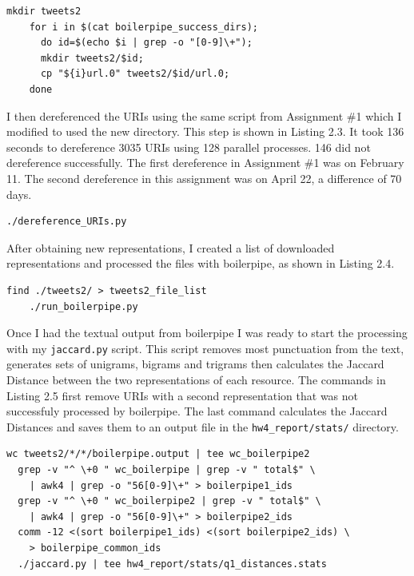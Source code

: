 \documentclass[a4paper,12pt]{article}
\begin{document}
\begin{lstlisting}[basicstyle=\ttfamily,caption={Creating Second Tweets Directory}]
    mkdir tweets2
    for i in $(cat boilerpipe_success_dirs);
      do id=$(echo $i | grep -o "[0-9]\+");
      mkdir tweets2/$id;
      cp "${i}url.0" tweets2/$id/url.0;
    done
\end{lstlisting}

I then dereferenced the URIs using the same script from Assignment \#1 which I modified to
used the new directory\cite{hw1}. This step is shown in Listing 2.3. It took 136 seconds to dereference
3035 URIs using 128 parallel processes. 146 did not dereference successfully. The first dereference in
Assignment \#1 was on February 11. The second dereference in this assignment was on April 22, a difference
of 70 days.

\begin{lstlisting}[basicstyle=\ttfamily,caption={Dereferencing URIs}]
    ./dereference_URIs.py
\end{lstlisting}

After obtaining new representations, I created a list of downloaded representations and processed the files
with boilerpipe, as shown in Listing 2.4.

\begin{lstlisting}[basicstyle=\ttfamily,caption={Extracting Text with Boilerpipe}]
    find ./tweets2/ > tweets2_file_list
    ./run_boilerpipe.py
\end{lstlisting}

Once I had the textual output from boilerpipe I was ready to start the processing with my \texttt{jaccard.py}
script. This script removes most punctuation from the text, generates sets of unigrams, bigrams and trigrams
then calculates the Jaccard Distance between the two representations of each resource\cite{wiki:jaccard}.
The commands in Listing 2.5 first remove URIs with a second representation that was not successfuly processed by
boilerpipe. The last command calculates the Jaccard Distances and saves them to an output file in the
\texttt{hw4\_report/stats/} directory.

\begin{lstlisting}[basicstyle=\ttfamily,caption={Calculating Jaccard Distance}]
  wc tweets2/*/*/boilerpipe.output | tee wc_boilerpipe2
  grep -v "^ \+0 " wc_boilerpipe | grep -v " total$" \
    | awk4 | grep -o "56[0-9]\+" > boilerpipe1_ids
  grep -v "^ \+0 " wc_boilerpipe2 | grep -v " total$" \
    | awk4 | grep -o "56[0-9]\+" > boilerpipe2_ids
  comm -12 <(sort boilerpipe1_ids) <(sort boilerpipe2_ids) \
    > boilerpipe_common_ids
  ./jaccard.py | tee hw4_report/stats/q1_distances.stats
\end{lstlisting}
\end{document}
